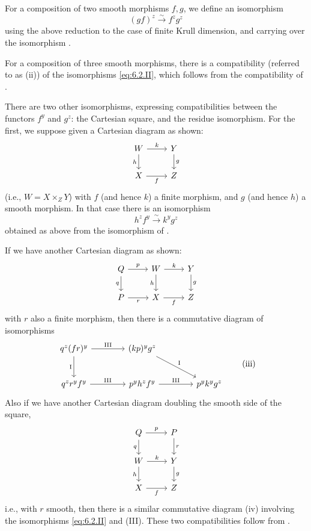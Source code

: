 For a composition of two smooth morphisms $f,g$, we define an isomorphism
\[
(gf)^{z} \xrightarrow{\sim} f^{z}g^{z} \tag{II}\label{eq:6.2.II}
\]
using the above reduction to the case of finite Krull dimension, and carrying over the isomorphism .

\label{compat:6.2.ii}
For a composition of three smooth morphisms, there is a compatibility (referred to as (ii)) of the isomorphisms \eqref{eq:6.2.II}, which follows from the compatibility of .

There are two other isomorphisms, expressing compatibilities between the functors $f^{y}$ and $g^{z}$: the Cartesian square, and the residue isomorphism. For the first, we suppose given a Cartesian diagram as shown:
\[
\begin{tikzcd}
	W \arrow[r, "k"] \arrow[d, "h"'] & Y \arrow[d, "g"] \\
	X \arrow[r, "f"'] & Z
\end{tikzcd}
\]
(i.e., $W = X\times_Z Y$) with $f$ (and hence $k$) a finite morphism, and $g$ (and hence $h$) a smooth morphism. In that case there is an isomorphism
\[
h^{z}f^{y} \xrightarrow{\sim} k^{y}g^{z} \tag{III}\label{eq:6.2.III}
\]
obtained as above from the isomorphism of .

If we have another Cartesian diagram as shown:
\[
\begin{tikzcd}
	Q \arrow[r, "p"] \arrow[d, "q"'] & W \arrow[r, "k"] \arrow[d, "h"'] & Y \arrow[d, "g"] \\
	P \arrow[r, "r"'] & X \arrow[r, "f"'] & Z
\end{tikzcd}
\]
with $r$ also a finite morphism, then there is a commutative diagram of isomorphisms
\[
\begin{tikzcd}[row sep=2.5em, column sep=4em]
	q^z(fr)^y
	\arrow[r, "\text{III}"]
	\arrow[d, "\text{I}"']
	& (kp)^y g^z
	\arrow[dr, "\text{I}"] \\
	q^z r^y f^y
	\arrow[r, "\text{III}"]
	& p^y h^z f^y
	\arrow[r, "\text{III}"]
	& p^y k^y g^z
\end{tikzcd}
\tag{iii}\label{eq:6.2.iii}
\]
\label{compat:6.2.iv}
Also if we have another Cartesian diagram doubling the smooth side of the square,
\[
\begin{tikzcd}
	Q \arrow[r, "p"] \arrow[d, "q"'] & P \arrow[d, "r"] \\
	W \arrow[r, "k"] \arrow[d, "h"'] & Y \arrow[d, "g"] \\
	X \arrow[r, "f"'] & Z
\end{tikzcd}
\]
i.e., with $r$ smooth, then there is a similar commutative diagram (iv) involving the isomorphisms \eqref{eq:6.2.II} and (III). These two compatibilities follow from .

